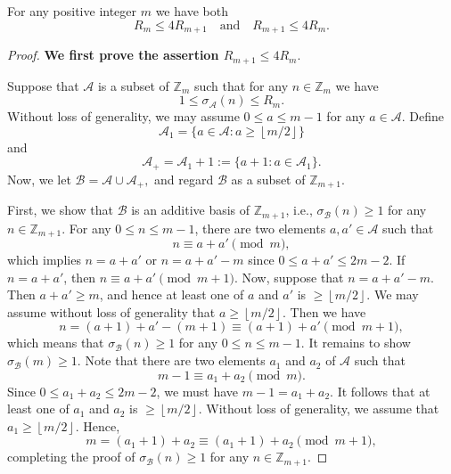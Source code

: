 \documentclass[10pt,a4paper]{amsart}
\newcommand{\floor}[1]{\left\lfloor #1\right\rfloor}
\begin{document}
 \begin{lemma}\label{lem:1}
   For any positive integer $m$ we have both
   $$R_m\le 4R_{m+1} \quad \text{and} \quad R_{m+1}\le 4R_{m}.$$
 \end{lemma}

 \begin{proof}
 {\bf We first prove the assertion $R_{m+1}\le 4R_{m}$}. 

 Suppose that $\mathcal{A}$ is a subset of $\mathbb{Z}_m$ such that for any $n\in \mathbb{Z}_m$ we have
 $$
 1\le \sigma_{\mathcal{A}}(n)\le R_{m}.
 $$
Without loss of generality, we may assume $0\le a\le m-1$ for any $a\in \mathcal{A}$. Define
$$
\mathcal{A}_{1}=\big\{a\in \mathcal{A}: a\ge \floor{m/2}\big\}
$$
and
$$
\mathcal{A}_{+}=\mathcal{A}_{1}+1:=\{a+1: a\in \mathcal{A}_{1}\}.
$$
Now, we let
$
\mathcal{B}=\mathcal{A}\cup \mathcal{A}_{+},
$
and regard $\mathcal{B}$ as a subset of $\mathbb{Z}_{m+1}$.

First, we show that $\mathcal{B}$ is an additive basis of $\mathbb{Z}_{m+1}$, i.e., $\sigma_{\mathcal{B}}(n)\ge 1$ for any $n\in \mathbb{Z}_{m+1}$. For any $0\le n\le m-1$, there are two elements $a, a'\in \mathcal{A}$ such that
$$
n\equiv a+a'\pmod{m},
$$
which implies $n=a+a'$ or $n=a+a'-m$ since $0\le a+a'\le 2m-2$. If $n=a+a'$, then 
$
n\equiv a+a'\pmod{m+1}.
$
Now, suppose that $n=a+a'-m$. Then $a+a'\ge m$, and hence at least one of $a$ and $a'$ is $\ge \floor{m/2}$. We may assume without loss of generality that $a\ge \floor{m/2}$. Then we have
$$
n=(a+1)+a'-(m+1)\equiv (a+1)+a'\pmod{m+1},
$$
which means that $\sigma_{\mathcal{B}}(n)\ge 1$ for any $0\le n\le m-1$. It remains to show $\sigma_{\mathcal{B}}(m)\ge 1$. Note that
there are two elements $a_1$ and $a_2$ of $\mathcal{A}$ such that
$$
m-1\equiv a_1+a_2\pmod{m}.
$$
Since $0\le a_1+a_2\le 2m-2$, we must have $m-1=a_1+a_2$. It follows that at least one of $a_1$ and $a_2$ is $\ge  \floor{m/2}$. Without loss of generality, we assume that $a_1\ge  \floor{m/2}$. Hence,
$$
m=(a_1+1)+a_2 \equiv (a_1+1)+a_2\pmod{m+1},
$$
completing the proof of $\sigma_{\mathcal{B}}(n)\ge 1$ for any $n\in \mathbb{Z}_{m+1}$.


\end{proof}
\end{document}

